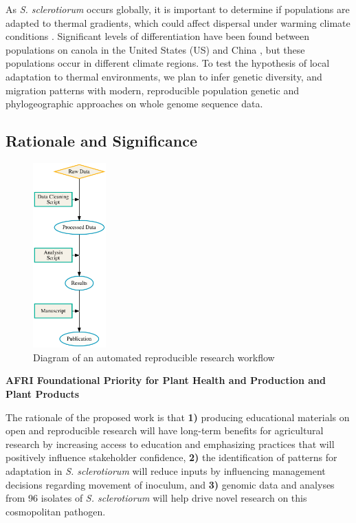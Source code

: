 \documentclass[12pt,letterpaper]{article}
\begin{document}

As \textit{S. sclerotiorum} occurs globally, it is important to determine if populations are adapted to thermal gradients, which could affect dispersal under warming climate conditions \citep{bolton2006sclerotinia,lehner2017sclerotinia,croll2016genetic}.
Significant levels of differentiation have been found between populations on canola in the United States (US) and China \citep{attanayake2013sclerotinia}, but these populations occur in different climate regions.
To test the hypothesis of local adaptation to thermal environments, we plan to infer genetic diversity, and migration patterns with modern, reproducible population genetic and phylogeographic approaches on whole genome sequence data. 


\subsection{Rationale and Significance}
\begin{figure} %
  \includegraphics[width=0.25\textwidth]{figure/rr.pdf}
  \caption{Diagram of an automated reproducible research workflow}
  \label{fig:rr}
\end{figure}

\noindent
\textbf{AFRI Foundational Priority for Plant Health and Production and Plant Products}

The rationale of the proposed work is that 
\textbf{1)} producing educational materials on open and reproducible research will have long-term benefits for agricultural research by increasing access to education and emphasizing practices that will positively influence stakeholder confidence, 
\textbf{2)} the identification of patterns for adaptation in \textit{S. sclerotiorum} will reduce inputs by influencing management decisions regarding movement of inoculum, and 
\textbf{3)} genomic data and analyses from 96 isolates of \textit{S. sclerotiorum} will help drive novel research on this cosmopolitan pathogen. 
\end{document}
